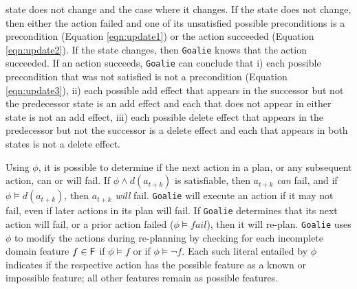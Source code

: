 \documentclass{article}
\def\FFRISKY{{\tt DeFAULT}}
\def\goalie{{\tt Goalie}}
\begin{document}
state does not change and the case where it changes.  If the state does not
change, then either the action failed and one of its unsatisfied possible
preconditions is a precondition (Equation \ref{eqn:update1}) or the action
succeeded (Equation \ref{eqn:update2}).  If the state changes, then \goalie{}
knows that the action succeeded.  If an action succeeds, \goalie{} can conclude
that i) each possible precondition that was not satisfied is not a precondition
(Equation \ref{eqn:update3}), ii) each possible add effect that appears in the
successor but not the predecessor state is an add effect and each that does not
appear in either state is not an add effect, iii) each possible delete effect
that appears in the predecessor but not the successor is a delete effect and
each that  appears in both states is not a delete effect.

Using $\phi$, it is possible to determine if the next action in a plan, or any
subsequent action, can or will fail.  If  $\phi \wedge d(a_{t+k})$ is
satisfiable, then $a_{t+k}$ {\em can} fail, and if $\phi \models d(a_{t+k})$,
then $a_{t+k}$ {\em will}  fail.  \goalie{} will execute an action if it may not
fail, even if later actions in its plan will fail.  If \goalie{} determines that
its next action will fail, or a prior action failed ($\phi \models fail$), then
it will re-plan.  \goalie{}  uses $\phi$ to modify the actions during
re-planning by checking for each incomplete domain feature $f \in {\sf
F}$ if $\phi \models f$ or if $\phi \models \neg f$.  Each such
literal entailed by $\phi$ indicates if the respective action has the possible
feature as a known or impossible feature; all other features remain as possible
features.


\end{document}

